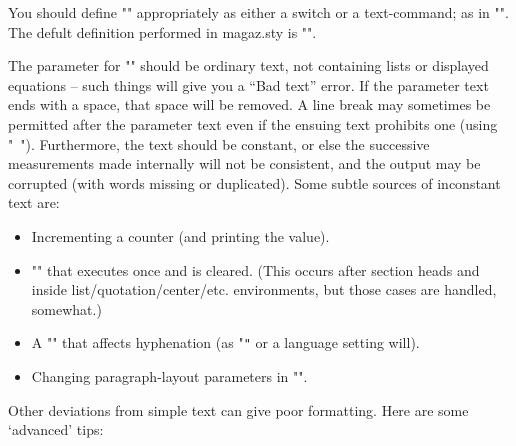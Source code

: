 \documentclass[parskip=half, pagesize=auto, 12pt]{scrartcl}
\newcommand*{\pkg}[1]{\textsf{#1}}
\begin{document}
You should define "\FirstLineFont" appropriately as either a switch 
or a text-command; as in "\renewcommand\FirstLineFont{\MakeUppercase}".
The defult definition performed in \pkg{magaz.sty} is 
"\providecommand\FirstLineFont{\scshape}".

The parameter for "\FirstLine" should be ordinary text, not containing
lists or displayed equations -- such things will give you a ``Bad text''
error. If the parameter text ends with a space, that space will be 
removed. A line break may sometimes be permitted after the parameter 
text even if the ensuing text prohibits one (using "~"). Furthermore, 
the text should be constant, or else the successive measurements made 
internally will not be consistent, and the output may be corrupted
(with words missing or duplicated). Some subtle sources of inconstant 
text are:
\begin{itemize}
\item Incrementing a counter (and printing the value).              
\item "\everypar" that executes once and is cleared. (This occurs after
    section heads and inside list/quotation/center/etc. environments,
    but those cases are handled, somewhat.)
\item A "\FirstLineFont" that affects hyphenation (as "\texttt" or a
    language setting will).
\item Changing paragraph-layout parameters in "\FirstLineFont".
\end{itemize}
Other deviations from simple text can give poor formatting. Here are some
`advanced' tips:
\end{document}
